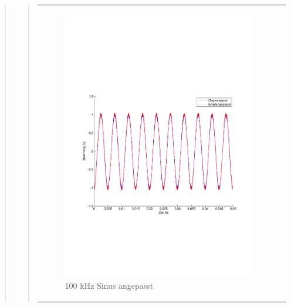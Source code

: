 \begin{quote}
\begin{quote}
\begin{center}
\begin{tabular}{ll}
                \begin{minipage}{0.6\textwidth}
                    \begin{figure}[H]
                        \includegraphics[scale=0.5, trim = 16mm 70mm 16mm 85mm, clip]
                                        {Bilder/100kHz_sin_Signal_Rekonstuiert_delayed}
                       \caption{100 kHz Sinus angepasst}
                      \label{fig:100kHz_sin_rek_angepasst}
                    \end{figure}
                \end{minipage}
            
            \end{tabular}
        \end{center}
        
        \vspace{2em}
        

\end{quote}
\end{quote}
